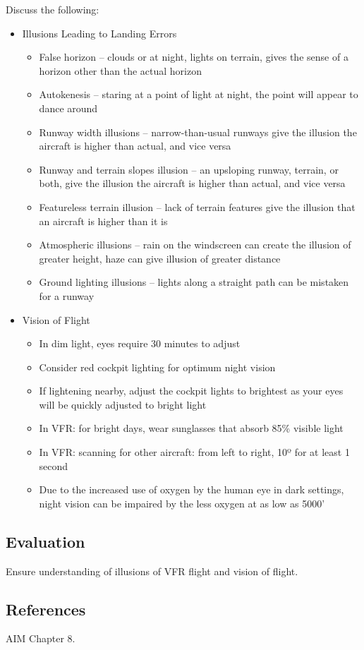 Discuss the following:
\begin{itemize}
  \item Illusions Leading to Landing Errors
    \begin{itemize}
      \item False horizon -- clouds or at night, lights on terrain, gives the
        sense of a horizon other than the actual horizon
      \item Autokenesis -- staring at a point of light at night, the point will
        appear to dance around
      \item Runway width illusions -- narrow-than-usual runways give the
        illusion the aircraft is higher than actual, and vice versa
      \item Runway and terrain slopes illusion -- an upsloping runway, terrain,
        or both, give the illusion the aircraft is higher than actual, and vice
        versa
      \item Featureless terrain illusion -- lack of terrain features give the
        illusion that an aircraft is higher than it is
      \item Atmospheric illusions -- rain on the windscreen can create the
        illusion of greater height, haze can give illusion of greater distance
      \item Ground lighting illusions -- lights along a straight path can be
        mistaken for a runway
    \end{itemize}
  \item Vision of Flight
    \begin{itemize}
      \item In dim light, eyes require 30 minutes to adjust
      \item Consider red cockpit lighting for optimum night vision
      \item If lightening nearby, adjust the cockpit lights to brightest as
        your eyes will be quickly adjusted to bright light
      \item In VFR: for bright days, wear sunglasses that absorb 85\% visible
        light
      \item In VFR: scanning for other aircraft: from left to right, 10º for at
        least 1 second
      \item Due to the increased use of oxygen by the human eye in dark
        settings, night vision can be impaired by the less oxygen at as low as
        5000'
    \end{itemize}
\end{itemize}

\subsection{Evaluation}

Ensure understanding of illusions of VFR flight and vision of flight.

\subsection{References}

AIM Chapter 8.

